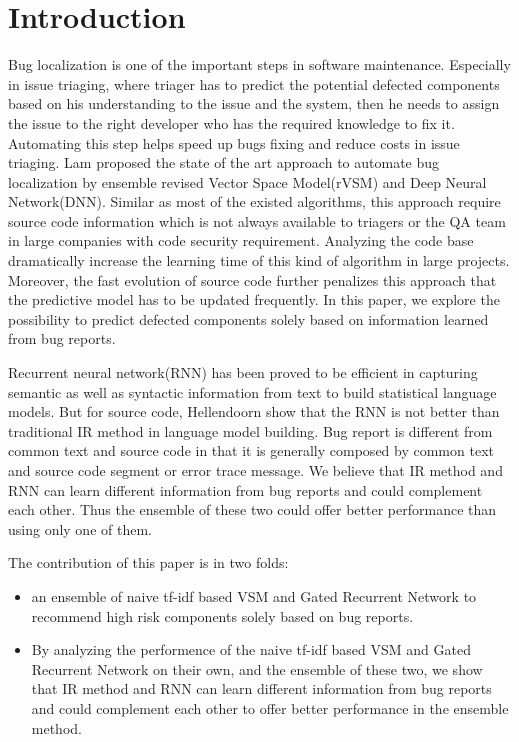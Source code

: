 \section{Introduction}
Bug localization is one of the important steps in software maintenance.
Especially in issue triaging, where triager has to predict the potential defected components based on his understanding to the issue and the system, then he needs to assign the issue to the right developer who has the required knowledge to fix it.
Automating this step helps speed up bugs fixing and reduce costs in issue triaging.
Lam \etal\cite{lam2017bug} proposed the state of the art approach to automate bug localization by ensemble revised Vector Space Model(rVSM)\cite{zhou2012should} and Deep Neural Network(DNN).  
Similar as most of the existed algorithms, this approach require source code information which is not always available to triagers or the QA team in large companies with code security requirement.
Analyzing the code base dramatically increase the learning time of this kind of algorithm in large projects.
Moreover, the fast evolution of source code further penalizes this approach that the predictive model has to be updated frequently.   
In this paper, we explore the possibility to predict defected components solely based on information learned from bug reports.

Recurrent neural network(RNN) has been proved to be efficient in capturing semantic as well as syntactic information from text to build statistical language models.
But for source code, Hellendoorn \etal show that the RNN is not better than traditional IR method in language model building\cite{hellendoorn2017deep}.
Bug report is different from common text and source code in that it is generally composed by common text and source code segment or error trace message. 
We believe that IR method and RNN can learn different information from bug reports and could complement each other.
Thus the ensemble of these two could offer better performance than using only one of them.

The contribution of this paper is in two folds:  
\begin{itemize}
	\item an ensemble of naive tf-idf based VSM and Gated Recurrent Network to recommend high risk components solely based on bug reports.
	\item By analyzing the performence of the naive tf-idf based VSM and Gated Recurrent Network on their own, and the ensemble of these two, we show that IR method and RNN can learn different information from bug reports and could complement each other to offer better performance in the ensemble method.
\end{itemize}

